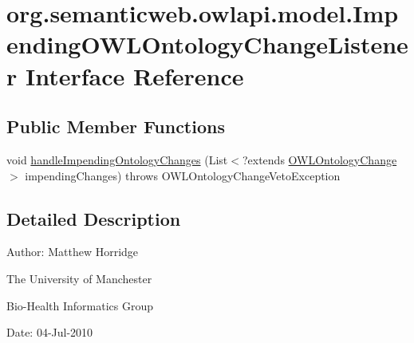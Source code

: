 \hypertarget{interfaceorg_1_1semanticweb_1_1owlapi_1_1model_1_1_impending_o_w_l_ontology_change_listener}{\section{org.\-semanticweb.\-owlapi.\-model.\-Impending\-O\-W\-L\-Ontology\-Change\-Listener Interface Reference}
\label{interfaceorg_1_1semanticweb_1_1owlapi_1_1model_1_1_impending_o_w_l_ontology_change_listener}
}
\subsection*{Public Member Functions}
\begin{DoxyCompactItemize}
\item 
void \hyperlink{interfaceorg_1_1semanticweb_1_1owlapi_1_1model_1_1_impending_o_w_l_ontology_change_listener_a1764922cb50e4f4f59c0d0de45203038}{handle\-Impending\-Ontology\-Changes} (List$<$?extends \hyperlink{classorg_1_1semanticweb_1_1owlapi_1_1model_1_1_o_w_l_ontology_change}{O\-W\-L\-Ontology\-Change} $>$ impending\-Changes)  throws O\-W\-L\-Ontology\-Change\-Veto\-Exception
\end{DoxyCompactItemize}


\subsection{Detailed Description}
Author\-: Matthew Horridge\par
 The University of Manchester\par
 Bio-\/\-Health Informatics Group\par
 Date\-: 04-\/\-Jul-\/2010 

